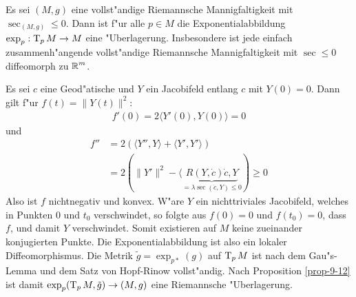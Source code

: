 \begin{Satz}
  Es sei $(M,g)$ eine vollst"andige Riemannsche Mannigfaltigkeit mit $\sec_{(M,g)} \le 0$. Dann ist f"ur alle $p \in M$ die Exponentialabbildung $\exp_p: \operatorname{T}_pM \to M$ eine "Uberlagerung.
  Insbesondere ist jede einfach zusammenh"angende vollst"andige Riemannsche Mannigfaltigkeit mit $\sec \le 0$ diffeomorph zu $\operatorname{\mathbb{R}}^m$.
\end{Satz}

\begin{bew}
  Es sei $c$ eine Geod"atische und $Y$ ein Jacobifeld entlang $c$ mit $Y(0) = 0$. Dann gilt f"ur $f(t) = \|Y(t)\|^2$:
  \begin{align*}
    f'(0) = 2 \langle Y'(0), Y(0) \rangle = 0
  \end{align*}
  und
  \begin{align*}
    f'' &= 2 (\langle Y'', Y \rangle + \langle Y', Y' \rangle)\\
    &= 2 (\|Y'\|^2 - \langle \underbrace{R(Y, \dot c) \dot c, Y}_{=\lambda\sec(\dot c, Y) \le 0}) \ge 0
  \end{align*}
  Also ist $f$ nichtnegativ und konvex. W"are $Y$ ein nichttriviales Jacobifeld, welches in Punkten $0$ und $t_0$ verschwindet, so folgte aus $f(0) = 0$ und $f(t_0) = 0$, dass $f$, und damit $Y$ verschwindet.
  Somit existieren auf $M$ keine zueinander konjugierten Punkte.
  Die Exponentialabbildung ist also ein lokaler Diffeomorphismus.
  Die Metrik $\tilde g = \exp_{p*}(g)$ auf $\operatorname{T}_pM$ ist nach dem Gau"s-Lemma und dem Satz von Hopf-Rinow vollst"andig.
  Nach Proposition \ref{prop-9-12} ist damit $\exp_p(\operatorname{T}_pM, \tilde g) \to (M,g)$ eine Riemannsche "Uberlagerung.
\end{bew}

